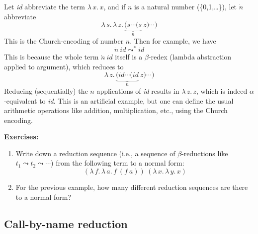 \documentclass{article}
\begin{document}
Let \textit{id} abbreviate the term $\lambda\,x.\, x$, and if $n$ is a natural number (\{0,1,\ldots\}),
let $\dot{n}$ abbreviate
\[
\lambda\,s.\, \lambda\,z.\, \underbrace{(s \cdots (s}_n\ z)\cdots)
\]
\noindent This is the Church-encoding of number $n$.  Then for example, we have
\[
\dot{n}\ \textit{id} \leadsto^* \textit{id}
\]
\noindent This is because the whole term $\dot{n}\ \textit{id}$ itself is a $\beta$-redex
(lambda abstraction applied to argument), which reduces to
\[
\lambda\,z.\, \underbrace{(\textit{id} \cdots (\textit{id}}_n\ z)\cdots)
\]
\noindent Reducing (sequentially) the $n$ applications of \textit{id} results in $\lambda\,z.\, z$,
which is indeed $\alpha$-equivalent to \textit{id}.  This is an artificial example,
but one can define the usual arithmetic operations like addition, multiplication, etc., using
the Church encoding.

\textbf{Exercises:}
\begin{enumerate}
\item Write down a reduction sequence (i.e., a sequence of $\beta$-reductions like $t_1 \leadsto t_2 \leadsto \cdots$)
  from the following term to a normal form:
  \[
  (\lambda\,f.\,\lambda\, a.\, f\ (f\ a))\ (\lambda\,x.\,\lambda\, y.\, x)
  \]

\item For the previous example, how many different reduction sequences are there to a normal form?
\end{enumerate}


\subsection{Call-by-name reduction}
\end{document}
